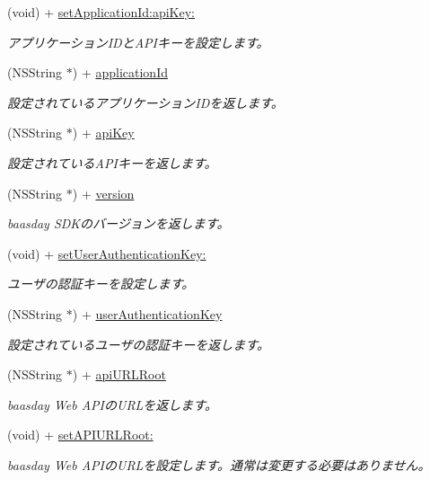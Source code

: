 \begin{DoxyCompactItemize}
\item 
(void) + \hyperlink{interface_b_d_baasday_a28ad1db2e5669fff9a863199558875d9}{set\-Application\-Id\-:api\-Key\-:}
\begin{DoxyCompactList}\small\item\em アプリケーション\-I\-Dと\-A\-P\-Iキーを設定します。 \end{DoxyCompactList}\item 
(N\-S\-String $\ast$) + \hyperlink{interface_b_d_baasday_a5197d512ac471736b3cd7504eab5e616}{application\-Id}
\begin{DoxyCompactList}\small\item\em 設定されているアプリケーション\-I\-Dを返します。 \end{DoxyCompactList}\item 
(N\-S\-String $\ast$) + \hyperlink{interface_b_d_baasday_a77957213ffb7cfacda2fa654052ed42d}{api\-Key}
\begin{DoxyCompactList}\small\item\em 設定されている\-A\-P\-Iキーを返します。 \end{DoxyCompactList}\item 
(N\-S\-String $\ast$) + \hyperlink{interface_b_d_baasday_aa438f9ac3201bed6a80d61b9266da2e2}{version}
\begin{DoxyCompactList}\small\item\em baasday S\-D\-Kのバージョンを返します。 \end{DoxyCompactList}\item 
(void) + \hyperlink{interface_b_d_baasday_a2945ce7e7204bdd06e8aab875867b0b5}{set\-User\-Authentication\-Key\-:}
\begin{DoxyCompactList}\small\item\em ユーザの認証キーを設定します。 \end{DoxyCompactList}\item 
(N\-S\-String $\ast$) + \hyperlink{interface_b_d_baasday_a3d8fec4aaacd7f75f373f6d516e52335}{user\-Authentication\-Key}
\begin{DoxyCompactList}\small\item\em 設定されているユーザの認証キーを返します。 \end{DoxyCompactList}\item 
(N\-S\-String $\ast$) + \hyperlink{interface_b_d_baasday_a07fb493ae3215a3bcbbd4a70fc55a35b}{api\-U\-R\-L\-Root}
\begin{DoxyCompactList}\small\item\em baasday Web A\-P\-Iの\-U\-R\-Lを返します。 \end{DoxyCompactList}\item 
(void) + \hyperlink{interface_b_d_baasday_ae4cf9d5c26f6f56cda4922262d9242c5}{set\-A\-P\-I\-U\-R\-L\-Root\-:}
\begin{DoxyCompactList}\small\item\em baasday Web A\-P\-Iの\-U\-R\-Lを設定します。通常は変更する必要はありません。 \end{DoxyCompactList}\end{DoxyCompactItemize}


